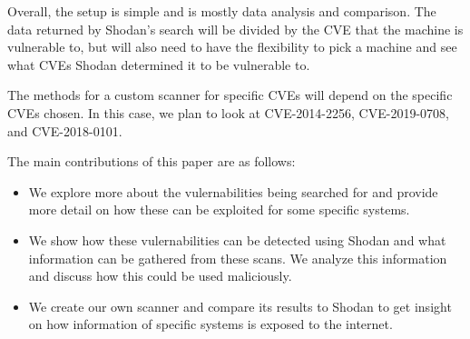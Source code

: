Overall, the setup is simple and is mostly data analysis and comparison.
The data returned by Shodan's search will be divided by the CVE that the
machine is vulnerable to, but will also need to have the flexibility to
pick a machine and see what CVEs Shodan determined it to be vulnerable to.

The methods for a custom scanner for specific CVEs will depend on the
specific CVEs chosen. In this case, we plan to look at CVE-2014-2256,
CVE-2019-0708, and CVE-2018-0101.

The main contributions of this paper are as follows:
\begin{itemize}
    \item We explore more about the vulernabilities being searched for and
        provide more detail on how these can be exploited for some specific
        systems.
    \item We show how these vulernabilities can be detected using Shodan
        and what information can be gathered from these scans. We analyze
        this information and discuss how this could be used maliciously.
    \item We create our own scanner and compare its results to Shodan to
        get insight on how information of specific systems is exposed to
        the internet.
\end{itemize}
